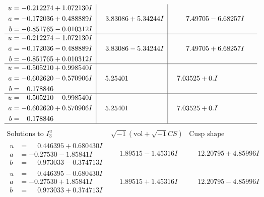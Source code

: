 \documentclass[1p]{elsarticle_modified}
\theoremstyle{definition}
\newcommand{\I}{\sqrt{-1}}
\begin{document}
$$\begin{array}{c|c|c}
\begin{aligned}
u &= -0.212274 + 1.072130 I \\
a &= -0.172036 + 0.488889 I \\
b &= -0.851765 - 0.010312 I\end{aligned}
 & \phantom{-}3.83086 + 5.34244 I & \phantom{-}7.49705 - 6.68257 I \\ \hline\begin{aligned}
u &= -0.212274 - 1.072130 I \\
a &= -0.172036 - 0.488889 I \\
b &= -0.851765 + 0.010312 I\end{aligned}
 & \phantom{-}3.83086 - 5.34244 I & \phantom{-}7.49705 + 6.68257 I \\ \hline\begin{aligned}
u &= -0.505210 + 0.998540 I \\
a &= -0.602620 - 0.570906 I \\
b &= \phantom{-}0.178846\phantom{ +0.000000I}\end{aligned}
 & \phantom{-}5.25401\phantom{ +0.000000I} & \phantom{-}7.03525 + 0. I\phantom{ +0.000000I} \\ \hline\begin{aligned}
u &= -0.505210 - 0.998540 I \\
a &= -0.602620 + 0.570906 I \\
b &= \phantom{-}0.178846\phantom{ +0.000000I}\end{aligned}
 & \phantom{-}5.25401\phantom{ +0.000000I} & \phantom{-}7.03525 + 0. I\phantom{ +0.000000I}\\
 \hline 
 \end{array}$$\newpage$$\begin{array}{c|c|c}  
\text{Solutions to }I^u_{3}& \I (\text{vol} + \sqrt{-1}CS) & \text{Cusp shape}\\
 \hline 
\begin{aligned}
u &= \phantom{-}0.446395 + 0.680430 I \\
a &= -0.27530 - 1.85841 I \\
b &= \phantom{-}0.973033 - 0.374713 I\end{aligned}
 & \phantom{-}1.89515 - 1.45316 I & \phantom{-}12.20795 + 4.85996 I \\ \hline\begin{aligned}
u &= \phantom{-}0.446395 - 0.680430 I \\
a &= -0.27530 + 1.85841 I \\
b &= \phantom{-}0.973033 + 0.374713 I\end{aligned}
 & \phantom{-}1.89515 + 1.45316 I & \phantom{-}12.20795 - 4.85996 I \\ \hline\begin{aligned}

\end{aligned}
\end{array}$$
\end{document}
